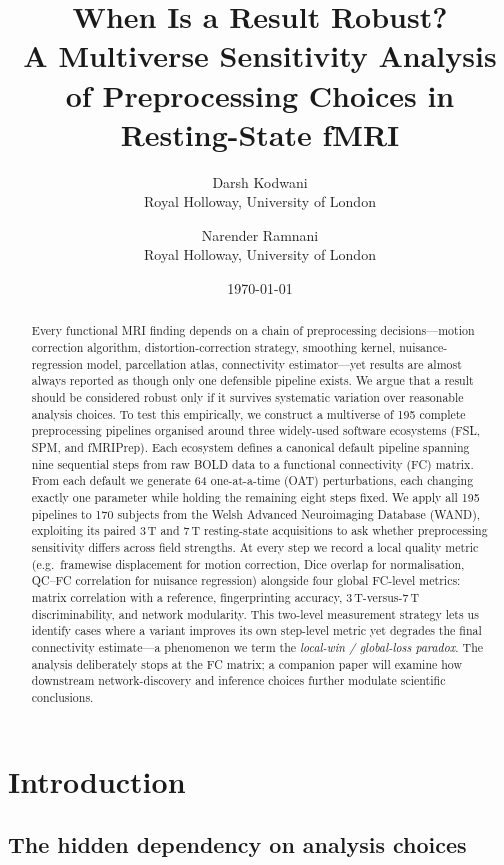 \documentclass[11pt,a4paper]{article}
\title{\textbf{When Is a Result Robust?}\\[0.4em]
A Multiverse Sensitivity Analysis of Preprocessing Choices in Resting-State fMRI}
\author{
    Darsh Kodwani\\
    \small Royal Holloway, University of London
    \and
    Narender Ramnani\\
    \small Royal Holloway, University of London
}
\date{\today}
\begin{document}
\maketitle
\tableofcontents
\newpage

\begin{abstract}
Every functional MRI finding depends on a chain of preprocessing decisions---motion correction algorithm, distortion-correction strategy, smoothing kernel, nuisance-regression model, parcellation atlas, connectivity estimator---yet results are almost always reported as though only one defensible pipeline exists. We argue that a result should be considered robust only if it survives systematic variation over reasonable analysis choices. To test this empirically, we construct a multiverse of 195 complete preprocessing pipelines organised around three widely-used software ecosystems (FSL, SPM, and fMRIPrep). Each ecosystem defines a canonical default pipeline spanning nine sequential steps from raw BOLD data to a functional connectivity (FC) matrix. From each default we generate 64 one-at-a-time (OAT) perturbations, each changing exactly one parameter while holding the remaining eight steps fixed. We apply all 195 pipelines to 170 subjects from the Welsh Advanced Neuroimaging Database (WAND), exploiting its paired 3\,T and 7\,T resting-state acquisitions to ask whether preprocessing sensitivity differs across field strengths. At every step we record a local quality metric (e.g.\ framewise displacement for motion correction, Dice overlap for normalisation, QC--FC correlation for nuisance regression) alongside four global FC-level metrics: matrix correlation with a reference, fingerprinting accuracy, 3\,T-versus-7\,T discriminability, and network modularity. This two-level measurement strategy lets us identify cases where a variant improves its own step-level metric yet degrades the final connectivity estimate---a phenomenon we term the \emph{local-win / global-loss paradox}. The analysis deliberately stops at the FC matrix; a companion paper will examine how downstream network-discovery and inference choices further modulate scientific conclusions.
\end{abstract}

\newpage

\section{Introduction}

\subsection{The hidden dependency on analysis choices}
\end{document}
